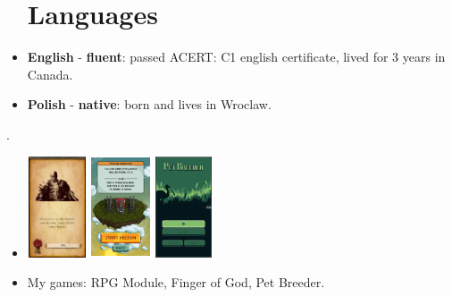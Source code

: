 \documentclass[12pt,a4paper]{article}
\begin{document}
\begin{multicols}{2}
\begin{itemize}[leftmargin=7.0cm]
	\centering	
	\section*{Languages}
	\justifying
	\setlength\itemsep{0.0cm}
	\item[] \textbf{English} - \textbf{fluent}: passed ACERT: C1 english certificate, lived for 3 years in Canada.
	\item[] \textbf{Polish} - \textbf{native}: born and lives in Wroclaw.
\end{itemize} 

\vspace{2cm}
.
\vfill

\begin{itemize}[leftmargin=7.0cm]
	\centering
	\setlength\itemsep{0.0cm}
	\item[] 	
		\includegraphics[height=3.0cm,width=1.75cm]{games/rpg_module2.png} 
		\includegraphics[height=3.0cm,width=1.75cm]{games/fog.png} 
		\includegraphics[height=3.0cm,width=1.75cm]{games/pet-breeder.png}
	\item[]
		My games: RPG Module, Finger of God, Pet Breeder.

\end{itemize} 





\end{multicols}
\end{document}
